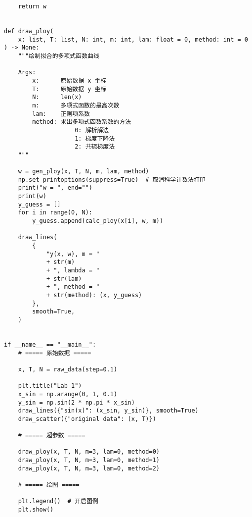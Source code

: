 \begin{verbatim}
    return w


def draw_ploy(
    x: list, T: list, N: int, m: int, lam: float = 0, method: int = 0
) -> None:
    """绘制拟合的多项式函数曲线

    Args:
        x:      原始数据 x 坐标
        T:      原始数据 y 坐标
        N:      len(x)
        m:      多项式函数的最高次数
        lam:    正则项系数
        method: 求出多项式函数系数的方法
                    0: 解析解法
                    1: 梯度下降法
                    2: 共轭梯度法
    """

    w = gen_ploy(x, T, N, m, lam, method)
    np.set_printoptions(suppress=True)  # 取消科学计数法打印
    print("w = ", end="")
    print(w)
    y_guess = []
    for i in range(0, N):
        y_guess.append(calc_ploy(x[i], w, m))

    draw_lines(
        {
            "y(x, w), m = "
            + str(m)
            + ", lambda = "
            + str(lam)
            + ", method = "
            + str(method): (x, y_guess)
        },
        smooth=True,
    )


if __name__ == "__main__":
    # ===== 原始数据 =====

    x, T, N = raw_data(step=0.1)

    plt.title("Lab 1")
    x_sin = np.arange(0, 1, 0.1)
    y_sin = np.sin(2 * np.pi * x_sin)
    draw_lines({"sin(x)": (x_sin, y_sin)}, smooth=True)
    draw_scatter({"original data": (x, T)})

    # ===== 超参数 =====

    draw_ploy(x, T, N, m=3, lam=0, method=0)
    draw_ploy(x, T, N, m=3, lam=0, method=1)
    draw_ploy(x, T, N, m=3, lam=0, method=2)

    # ===== 绘图 =====

    plt.legend()  # 开启图例
    plt.show()
\end{verbatim}
